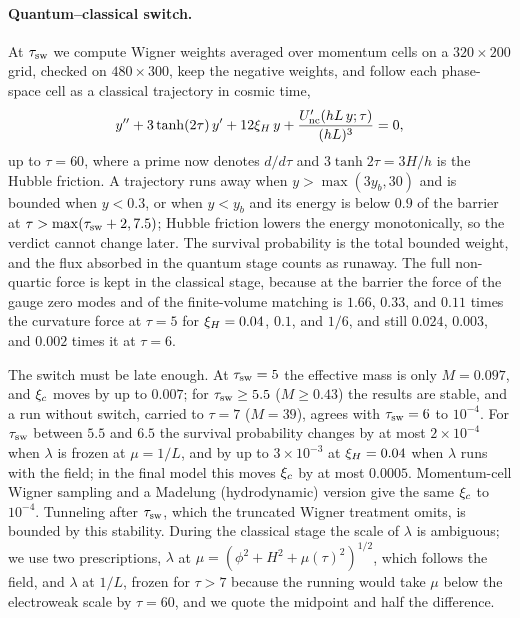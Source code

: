 \paragraph{Quantum--classical switch.}
At $\tau_{\rm sw}$ we compute Wigner weights averaged over momentum cells on a $320\times200$ grid, checked on $480\times300$, keep the negative weights, and follow each phase-space cell as a classical trajectory in cosmic time,
\begin{equation}
y''+3\tanh(2\tau)\,y'+12\xi_H\,y+\frac{U_{\rm nc}'(hL\,y;\tau)}{(hL)^3}=0,
\label{eq:rb-classical}
\end{equation}
up to $\tau=60$, where a prime now denotes $d/d\tau$ and $3\tanh2\tau=3H/h$ is the Hubble friction. %
A trajectory runs away when $y>\max(3y_b,30)$ and is bounded when $y<0.3$, or when $y<y_b$ and its energy is below $0.9$ of the barrier at $\tau>\max(\tau_{\rm sw}+2,7.5)$; Hubble friction lowers the energy monotonically, so the verdict cannot change later. %
The survival probability is the total bounded weight, and the flux absorbed in the quantum stage counts as runaway.
The full non-quartic force is kept in the classical stage, because at the barrier the force of the gauge zero modes and of the finite-volume matching is $1.66$, $0.33$, and $0.11$ times the curvature force at $\tau=5$ for $\xi_H=0.04$, $0.1$, and $1/6$, and still $0.024$, $0.003$, and $0.002$ times it at $\tau=6$. %

The switch must be late enough.
At $\tau_{\rm sw}=5$ the effective mass is only $M=0.097$, and $\xi_c$ moves by up to $0.007$; for $\tau_{\rm sw}\ge5.5$ ($M\ge0.43$) the results are stable, and a run without switch, carried to $\tau=7$ ($M=39$), agrees with $\tau_{\rm sw}=6$ to $10^{-4}$. %
For $\tau_{\rm sw}$ between $5.5$ and $6.5$ the survival probability changes by at most $2\times10^{-4}$ when $\lambda$ is frozen at $\mu=1/L$, and by up to $3\times10^{-3}$ at $\xi_H=0.04$ when $\lambda$ runs with the field; in the final model this moves $\xi_c$ by at most $0.0005$. %
Momentum-cell Wigner sampling and a Madelung (hydrodynamic) version give the same $\xi_c$ to $10^{-4}$. %
Tunneling after $\tau_{\rm sw}$, which the truncated Wigner treatment omits, is bounded by this stability.
During the classical stage the scale of $\lambda$ is ambiguous; we use two prescriptions, $\lambda$ at $\mu=(\phi^2+H^2+\mu(\tau)^2)^{1/2}$, which follows the field, and $\lambda$ at $1/L$, frozen for $\tau>7$ because the running would take $\mu$ below the electroweak scale by $\tau=60$, and we quote the midpoint and half the difference.

